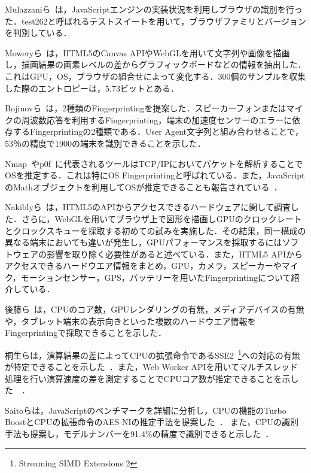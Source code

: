 Mulazzaniら~\cite{mulazzani2013fast}は，JavaScriptエンジンの実装状況を利用しブラウザの識別を行った．test262と呼ばれるテストスイートを用いて，ブラウザファミリとバージョンを判別している．

Moweryら~\cite{mowery2012pixel}は，HTML5のCanvas APIやWebGLを用いて文字列や画像を描画し，描画結果の画素レベルの差からグラフィックボードなどの情報を抽出した．これはGPU，OS，ブラウザの組合せによって変化する．300個のサンプルを収集した際のエントロピーは，5.73ビットとある．

Bojinovら~\cite{bojinov2014mobile}は，2種類のFingerprintingを提案した．スピーカーフォンまたはマイクの周波数応答を利用するFingerprinting，端末の加速度センサーのエラーに依存するFingerprintingの2種類である．User Agent文字列と組み合わせることで，53％の精度で1900の端末を識別できることを示した．

Nmap~\cite{nmap}やp0f~\cite{p0f}に代表されるツールはTCP/IPにおいてパケットを解析することでOSを推定する．これは特にOS Fingerprintingと呼ばれている．また，JavaScriptのMathオブジェクトを利用してOSが推定できることも報告されている~\cite{tor_bugtrack}．

Nakiblyら~\cite{nakibly2015hardware}は，HTML5のAPIからアクセスできるハードウェアに関して調査した．さらに，WebGLを用いてブラウザ上で図形を描画しGPUのクロックレートとクロックスキューを採取する初めての試みを実施した．その結果，同一構成の異なる端末においても違いが発生し，GPUパフォーマンスを採取するにはソフトウェアの影響を取り除く必要性があると述べている．また，HTML5 APIからアクセスできるハードウエア情報をまとめ，GPU，カメラ，スピーカーやマイク，モーションセンサー，GPS，バッテリーを用いたFingerprintingについて紹介している．

後藤ら~\cite{後藤浩行2013web}は，CPUのコア数，GPUレンダリングの有無，メディアデバイスの有無や，タブレット端末の表示向きといった複数のハードウエア情報をFingerprintingで採取できることを示した．

桐生らは，演算結果の差によってCPUの拡張命令であるSSE2~\footnote{Streaming SIMD Extensions 2}への対応の有無が特定できることを示した~\cite{桐生直輝2013cpu}．また，Web Worker APIを用いてマルチスレッド処理を行い演算速度の差を測定することでCPUコア数が推定できることを示した~~\cite{桐生直輝2014web}．

Saitoらは，JavaScriptのベンチマークを詳細に分析し，CPUの機能のTurbo BoostとCPUの拡張命令のAES-NIの推定手法を提案した~\cite{saito2016estimating}．
また，CPUの識別手法も提案し，モデルナンバーを91.4\%の精度で識別できると示した~\cite{saito2017web}．
